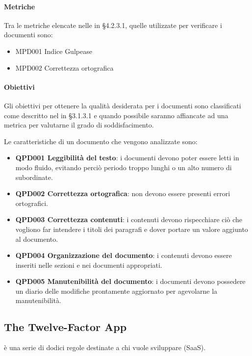 		\paragraph{Metriche}
		Tra le metriche elencate nelle \NdPv in  §4.2.3.1, quelle utilizzate per verificare i documenti sono:
		
		\begin{itemize}
			\item MPD001 Indice Gulpease
			\item MPD002 Correttezza ortografica
		\end{itemize} 
		
		\paragraph{Obiettivi}
		Gli obiettivi per ottenere la qualità desiderata per i documenti sono classificati come descritto nel \NdP in §3.1.3.1 e quando possibile saranno affiancate ad una metrica per valutarne il grado di soddisfacimento.
		
		Le caratteristiche di un documento che vengono analizzate sono:
		
		\begin{itemize}
			\item \textbf{QPD001 Leggibilità del testo}: i documenti devono poter essere letti in modo fluido, evitando perciò periodo troppo lunghi o un alto numero di subordinate.
			\item \textbf{QPD002 Correttezza ortografica}: non devono essere presenti errori ortografici.
			\item \textbf{QPD003 Correttezza contenuti}: i contenuti devono rispecchiare ciò che vogliono far intendere i titoli dei paragrafi e dover portare un valore aggiunto al documento.
			\item \textbf{QPD004 Organizzazione del documento}: i contenuti devono essere inseriti nelle sezioni e nei documenti appropriati.
			\item \textbf{QPD005 Manutenibilità del documento}: i documenti devono possedere un diario delle modifiche prontamente aggiornato per agevolarne la manutenibilità.
		\end{itemize}

\subsection{The Twelve-Factor App}
 è una serie di dodici regole destinate a chi vuole sviluppare  (SaaS).

